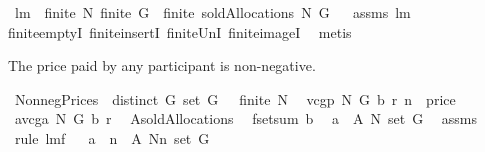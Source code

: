 \begin{isabellebody}
\endisatagproof
{\isafoldproof}%
%
\isadelimproof
%
\endisadelimproof
\isanewline
\isanewline
{}\isamarkupfalse%
\ lm{}{}{\isacharcolon}\ \ {\isachardoublequoteopen}finite\ N{\isachardoublequoteclose}\ {\isachardoublequoteopen}finite\ G{\isachardoublequoteclose}\ \ {\isachardoublequoteopen}finite\ {\isacharparenleft}soldAllocations\ N\ G{\isacharparenright}{\isachardoublequoteclose}%
\isadelimproof
\ %
\endisadelimproof
%
\isatagproof
{}\isamarkupfalse%
\ assms\ lm{}{}\isanewline
finite{\isachardot}emptyI\ finite{\isachardot}insertI\ finite{\isacharunderscore}UnI\ finite{\isacharunderscore}imageI\ \isamarkupfalse%
\ metis%
\endisatagproof
{\isafoldproof}%
%
\isadelimproof
%
\endisadelimproof
%
\begin{isamarkuptext}%
The price paid by any participant is non-negative.%
\end{isamarkuptext}%
\isamarkuptrue%
\isamarkupfalse%
\ NonnegPrices{\isacharcolon}\ \ {\isachardoublequoteopen}distinct\ G{\isachardoublequoteclose}\ {\isachardoublequoteopen}set\ G\ {\isasymnoteq}\ {\isacharbraceleft}{\isacharbraceright}{\isachardoublequoteclose}\ {\isachardoublequoteopen}finite\ N{\isachardoublequoteclose}\ \ \isanewline
{\isachardoublequoteopen}vcgp\ N\ G\ b\ r\ n\ {\isachargreater}{\isacharequal}\ {\isacharparenleft}{}{\isacharcolon}{\isacharcolon}price{\isacharparenright}{\isachardoublequoteclose}\ \isanewline
%
\isadelimproof
%
\endisadelimproof
%
\isatagproof
{}\isamarkupfalse%
\ {\isacharminus}\ \isanewline
{}\isamarkupfalse%
\ {\isacharquery}a{\isacharequal}{\isachardoublequoteopen}vcga\ N\ G\ b\ r{\isachardoublequoteclose}\ \isamarkupfalse%
\ {\isacharquery}A{\isacharequal}soldAllocations\ \isamarkupfalse%
\ {\isacharquery}f{\isacharequal}{\isachardoublequoteopen}setsum\ b{\isachardoublequoteclose}\ \isanewline
{}\isamarkupfalse%
\ {\isachardoublequoteopen}{\isacharquery}a\ {\isasymin}\ {\isacharquery}A\ N\ {\isacharparenleft}set\ G{\isacharparenright}{\isachardoublequoteclose}\ \isamarkupfalse%
\ assms\ \isamarkupfalse%
\ {\isacharparenleft}rule\ lm{}{}f{\isacharparenright}\isanewline
{}\isamarkupfalse%
\ \isamarkupfalse%
\ {\isachardoublequoteopen}{\isacharquery}a\ {\isacharminus}{\isacharminus}\ n\ {\isasymin}\ {\isacharquery}A\ {\isacharparenleft}N{\isacharminus}{\isacharbraceleft}n{\isacharbraceright}{\isacharparenright}\ {\isacharparenleft}set\ G{\isacharparenright}{\isachardoublequoteclose}\ \isamarkupfalse%

\end{isabellebody}

